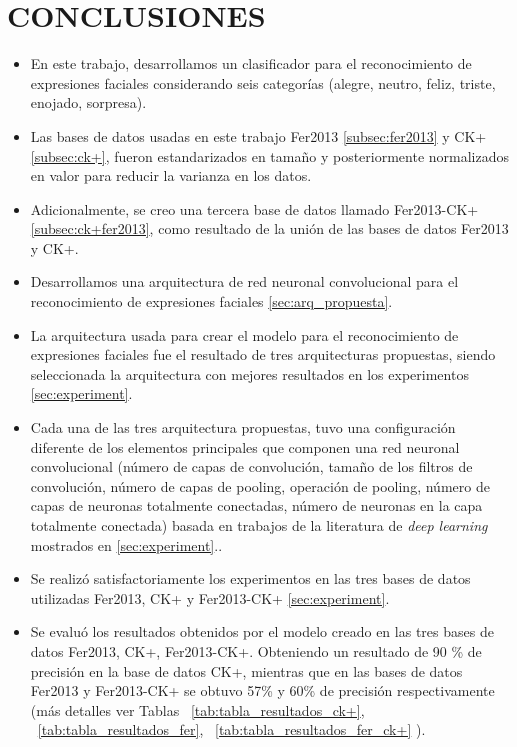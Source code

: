 \chapter*{CONCLUSIONES}
\begin{itemize}

\item En este trabajo, desarrollamos un clasificador para el reconocimiento de expresiones faciales considerando seis categorías (alegre, neutro, feliz, triste, enojado, sorpresa).

\item Las bases de datos usadas en este trabajo Fer2013 \ref{subsec:fer2013} y CK+ \ref{subsec:ck+}, fueron estandarizados en tamaño y posteriormente normalizados en valor para reducir la varianza en los datos. 

\item Adicionalmente, se creo una tercera base de datos llamado Fer2013-CK+ \ref{subsec:ck+fer2013}, como resultado de la unión de las bases de datos Fer2013 y CK+.  

\item Desarrollamos una arquitectura de red neuronal convolucional para el reconocimiento de expresiones faciales \ref{sec:arq_propuesta}.

\item La arquitectura usada para crear el modelo para el reconocimiento de expresiones faciales fue el resultado de tres arquitecturas propuestas, siendo seleccionada la arquitectura con mejores resultados en los experimentos \ref{sec:experiment}.

\item Cada una de las tres arquitectura propuestas, tuvo una  configuración diferente de los elementos principales que componen una red neuronal convolucional (número de capas de convolución, tamaño de los filtros de convolución, número de capas de pooling, operación de pooling, número de capas de neuronas totalmente conectadas, número de neuronas en la capa totalmente conectada) basada en trabajos de la literatura de \textit{deep learning} mostrados en \ref{sec:experiment}..

\item Se realizó satisfactoriamente los experimentos en las tres bases de datos utilizadas Fer2013, CK+ y Fer2013-CK+ \ref{sec:experiment}.

\item Se evaluó los resultados obtenidos por el modelo creado en las tres bases de datos Fer2013, CK+, Fer2013-CK+. Obteniendo un resultado de 90 \% de precisión en la base de datos CK+, mientras que en las bases de datos Fer2013 y Fer2013-CK+ se obtuvo 57\% y 60\% de precisión respectivamente (más detalles ver Tablas ~\ref{tab:tabla_resultados_ck+}, ~\ref{tab:tabla_resultados_fer}, ~\ref{tab:tabla_resultados_fer_ck+} ).



\end{itemize}
